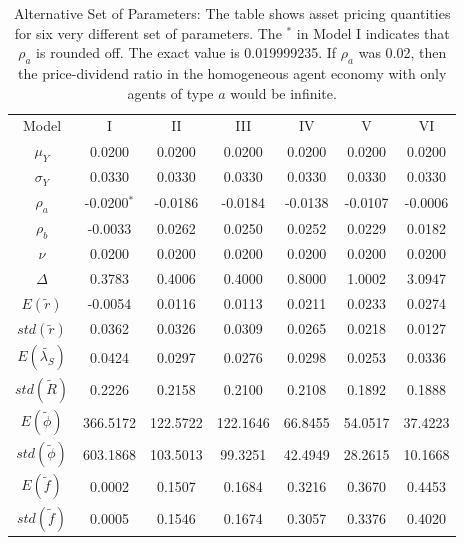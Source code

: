 
\begin{table}[H]
\centering
\begin{tabular}{ccccccc}
Model & I & II & III & IV & V & VI \\
$\mu_Y$ & 0.0200 & 0.0200 & 0.0200 & 0.0200 & 0.0200 & 0.0200 \\
$\sigma_Y$ & 0.0330 & 0.0330 & 0.0330 & 0.0330 & 0.0330 & 0.0330 \\
$\rho_a$ & -0.0200$^*$ & -0.0186 & -0.0184 & -0.0138 & -0.0107 & -0.0006 \\
$\rho_b$ & -0.0033 & 0.0262 & 0.0250 & 0.0252 & 0.0229 & 0.0182 \\
$\nu$ & 0.0200 & 0.0200 & 0.0200 & 0.0200 & 0.0200 & 0.0200 \\
$\Delta$ & 0.3783 & 0.4006 & 0.4000 & 0.8000 & 1.0002 & 3.0947 \\
$E(\tilde{r})$ & -0.0054 & 0.0116 & 0.0113 & 0.0211 & 0.0233 & 0.0274 \\
$std(\tilde{r})$ & 0.0362 & 0.0326 & 0.0309 & 0.0265 & 0.0218 & 0.0127 \\
$E(\tilde{\lambda_{S}})$ & 0.0424 & 0.0297 & 0.0276 & 0.0298 & 0.0253 & 0.0336 \\
$std(\tilde{R})$ & 0.2226 & 0.2158 & 0.2100 & 0.2108 & 0.1892 & 0.1888 \\
$E(\tilde{\phi})$ & 366.5172 & 122.5722 & 122.1646 & 66.8455 & 54.0517 & 37.4223 \\
$std(\tilde{\phi})$ & 603.1868 & 103.5013 & 99.3251 & 42.4949 & 28.2615 & 10.1668 \\
$E(\tilde{f})$ & 0.0002 & 0.1507 & 0.1684 & 0.3216 & 0.3670 & 0.4453 \\
$std(\tilde{f})$ & 0.0005 & 0.1546 & 0.1674 & 0.3057 & 0.3376 & 0.4020 \\
\end{tabular}
\caption{Alternative Set of Parameters: The table shows asset pricing quantities for  six very different set of parameters. The $^*$ in Model I indicates that $\rho_a$  is rounded off. The exact value is 0.019999235. If $\rho_a$ was 0.02, then the price-dividend ratio in the homogeneous agent economy with only agents of type $a$ would be infinite.}
\label{table:AltCalib}
\end{table}

